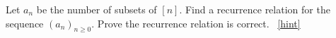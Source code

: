 \documentclass{book}
\begin{document}
\setcounter{project}{134}
\addtocounter{project}{-1}
\begin{activity}[]\label{activity-127}
\hypertarget{p-933}{}%
Let \(a_n\) be the number of subsets of \([n]\).  Find a recurrence relation for the sequence \((a_n)_{n \ge 0}\).  Prove the recurrence relation is correct.%
~\hfill{\tiny\hyperlink{a-134}{[hint]}\hypertarget{q-134}{}}\end{activity}
\end{document}
